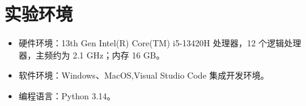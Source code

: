 \section{实验环境}
\begin{itemize}
    \item 硬件环境：13th Gen Intel(R) Core(TM) i5-13420H 处理器，12 个逻辑处理器，主频约为 2.1 GHz；内存 16 GB。
    \item 软件环境：Windows、MacOS,Visual Studio Code 集成开发环境。
    \item 编程语言：Python 3.14。
\end{itemize}
